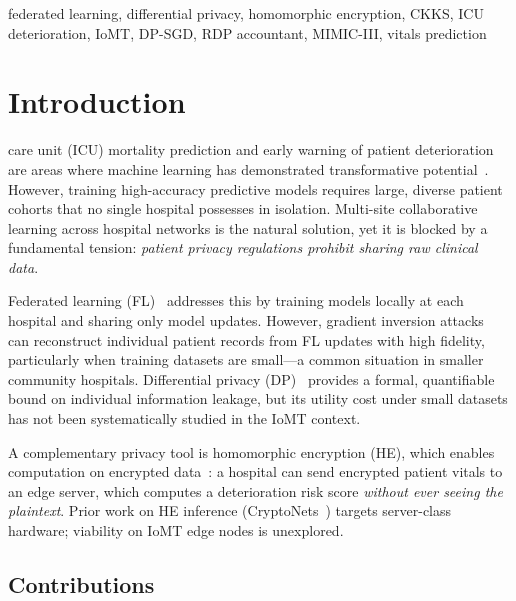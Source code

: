 \documentclass[10pt,journal,compsoc]{IEEEtran}
\begin{document}
\begin{IEEEkeywords}
federated learning, differential privacy, homomorphic encryption,
CKKS, ICU deterioration, IoMT, DP-SGD, RDP accountant,
MIMIC-III, vitals prediction
\end{IEEEkeywords}

\section{Introduction}
\label{sec:intro}

 care unit (ICU) mortality prediction
and early warning of patient deterioration are areas where
machine learning has demonstrated transformative potential~\cite{rajpurkar2022ai}.
However, training high-accuracy predictive models requires large,
diverse patient cohorts that no single hospital possesses in isolation.
Multi-site collaborative learning across hospital networks is the
natural solution, yet it is blocked by a fundamental tension:
\emph{patient privacy regulations prohibit sharing raw clinical data}.

Federated learning (FL)~\cite{mcmahan2017communication} addresses
this by training models locally at each hospital and sharing only
model updates.
However, gradient inversion attacks~\cite{zhao2020idlg,zhu2019dlg}
can reconstruct individual patient records from FL updates with
high fidelity, particularly when training datasets are small---a
common situation in smaller community hospitals.
Differential privacy (DP)~\cite{dwork2006calibrating} provides a
formal, quantifiable bound on individual information leakage, but
its utility cost under small datasets has not been systematically
studied in the IoMT context.

A complementary privacy tool is homomorphic encryption (HE), which
enables computation on encrypted data~\cite{gentry2009}:
a hospital can send encrypted patient vitals to an edge server, which
computes a deterioration risk score \emph{without ever seeing the
plaintext}.
Prior work on HE inference (CryptoNets~\cite{gilad2016cryptonets})
targets server-class hardware; viability on IoMT edge nodes is
unexplored.

\subsection{Contributions}
\end{document}
